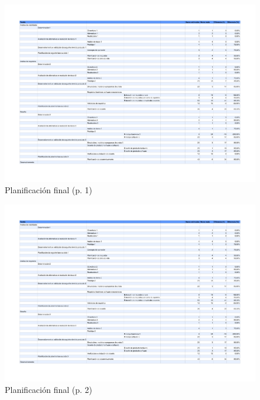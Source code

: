 \begin{figure}[htbp]
 \centering
 \includegraphics[scale=0.7,angle=90,page=1,keepaspectratio=true]{./imagenes/planificacion-final.pdf}
 \caption{Planificación final (p. 1)}
 \label{figura:PlanificacionFinal1}
\end{figure}

\begin{figure}[htbp]
 \centering
 \includegraphics[scale=0.7,angle=90,page=2,keepaspectratio=true]{./imagenes/planificacion-final.pdf}
 \caption{Planificación final (p. 2)}
 \label{figura:PlanificacionFinal2}
\end{figure}

